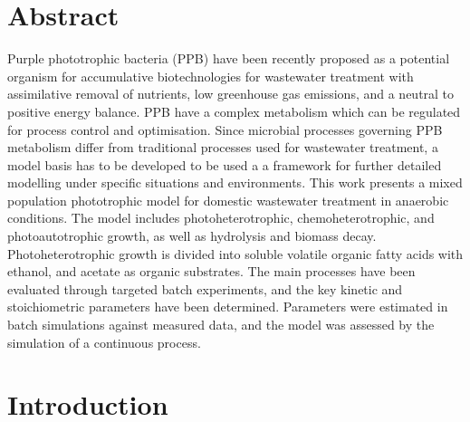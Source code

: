 \section*{Abstract}
Purple phototrophic bacteria (PPB) have been recently proposed as a potential organism for accumulative biotechnologies for wastewater treatment with assimilative removal of nutrients, low greenhouse gas emissions, and a neutral to positive energy balance. PPB have a complex metabolism which can be regulated for process control and optimisation. Since microbial processes governing PPB metabolism differ from traditional processes used for wastewater treatment, a model basis has to be developed to be used a a framework for further detailed modelling under specific situations and environments. This work presents a mixed population phototrophic model for domestic wastewater treatment in anaerobic conditions. The model includes photoheterotrophic, chemoheterotrophic, and photoautotrophic growth, as well as hydrolysis and biomass decay. Photoheterotrophic growth is divided into soluble volatile organic fatty acids with ethanol, and acetate as organic substrates. The main processes have been evaluated through targeted batch experiments, and the key kinetic and stoichiometric parameters have been determined. Parameters were estimated in batch simulations against measured data, and the model was assessed by the simulation of a continuous process.

\section{Introduction}
\label{Sec:chap2_intro}

